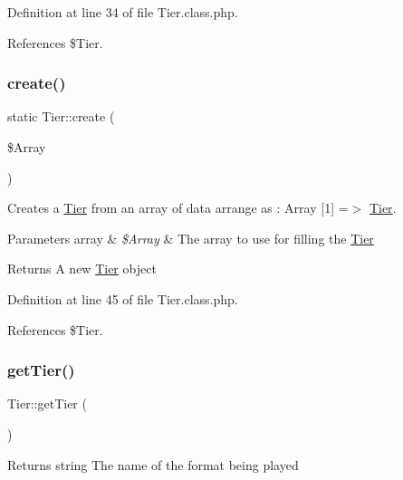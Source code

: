 Definition at line 34 of file Tier.\+class.\+php.



References \$\+Tier.

\mbox{\label{class_tier_adf30a0aceb6cedf3b1a10712f8eba5a9}} 
\subsubsection{\texorpdfstring{create()}{create()}}
{\footnotesize\ttfamily static Tier\+::create (\begin{DoxyParamCaption}\item[{}]{\$\+Array }\end{DoxyParamCaption})\hspace{0.3cm}{\ttfamily [static]}}



Creates a \hyperlink{class_tier}{Tier} from an array of data arrange as \+: Array \mbox{[}1\mbox{]} =$>$ \hyperlink{class_tier}{Tier}. 


\begin{DoxyParams}[1]{Parameters}
array & {\em \$\+Array} & The array to use for filling the \hyperlink{class_tier}{Tier} \\
\hline
\end{DoxyParams}
\begin{DoxyReturn}{Returns}
A new \hyperlink{class_tier}{Tier} object 
\end{DoxyReturn}


Definition at line 45 of file Tier.\+class.\+php.



References \$\+Tier.

\mbox{\label{class_tier_ab173f1e0c4652fc145f7d40368feaaea}} 
\subsubsection{\texorpdfstring{get\+Tier()}{getTier()}}
{\footnotesize\ttfamily Tier\+::get\+Tier (\begin{DoxyParamCaption}{ }\end{DoxyParamCaption})}

\begin{DoxyReturn}{Returns}
string The name of the format being played 
\end{DoxyReturn}


